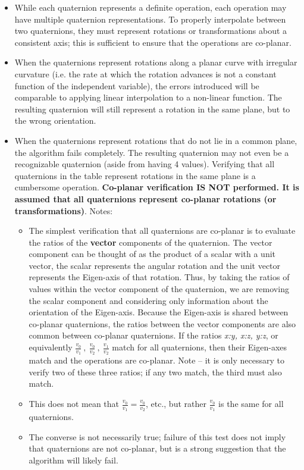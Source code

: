 \documentclass[11pt,fleqn]{report}
\begin{document}
\begin{itemize}
 \item While each quaternion represents a definite operation, each operation
 may have multiple quaternion representations.  To properly interpolate between
 two quaternions, they must represent rotations or transformations about a
 consistent axis; this is sufficient to ensure that the operations are
 co-planar.
 \item When the quaternions represent rotations along a planar curve with
 irregular curvature (i.e. the rate at which the rotation advances is not a
 constant function of the independent variable), the errors introduced will
 be comparable to applying linear interpolation to a non-linear function.
 The resulting quaternion will still represent a rotation in the same plane,
 but to the wrong orientation.
 \item When the quaternions represent rotations that do not lie in a common
 plane, the algorithm fails completely.  The resulting quaternion may not even
 be a recognizable quaternion (aside from having 4 values).  Verifying that all
 quaternions in the table represent rotations in the same plane is a cumbersome
 operation.  \textbf{Co-planar verification IS NOT performed.  It is assumed
 that all quaternions represent co-planar rotations (or transformations)}.
 Notes:
 \begin {itemize}
  \item The simplest verification that all quaternions are co-planar
  is to evaluate the ratios of the \textbf{vector} components of the
  quaternion.  The vector component can be thought of as the product of a
  scalar with
  a unit vector, the scalar represents the angular rotation and the unit
  vector represents the Eigen-axis of that rotation.  Thus, by taking the
  ratios of values within the vector component of the quaternion, we are
  removing the scalar component and considering only information about
  the orientation of the Eigen-axis.  Because the
  Eigen-axis is shared between co-planar quaternions, the ratios between
  the vector components are also common between co-planar quaternions.
  If the ratios \textit{ x:y, x:z, y:z}, or equivalently
  $\frac{v_0}{v_1} ~,~ \frac {v_0}{v_2} ~,~ \frac{v_1}{v_2}$
  match for all quaternions, then their Eigen-axes match and the
  operations are co-planar.  Note -- it is only necessary to verify two of
  these three ratios; if any two match, the third must also match.
  \item This does not mean that $\frac{v_0}{v_1} = \frac{v_0}{v_2}$, etc.,
  but rather $\frac{v_0}{v_1}$ is the same for all quaternions.
  \item The converse is not necessarily true; failure of this test does not
  imply that quaternions are not co-planar, but is a strong suggestion that the
  algorithm will likely fail.
 \end{itemize}
\end{itemize}
\end{document}
